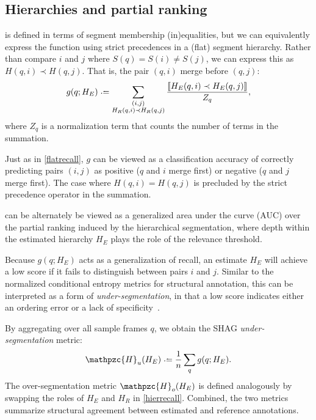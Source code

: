 \documentclass{article}
\def\shag{\ensuremath{\mathpzc{H}}}
\begin{document}
\subsection{Hierarchies and partial ranking}

 is defined in terms of segment membership (in)equalities, but 
we can equivalently express the function using strict precedences in a (flat)
segment hierarchy.
Rather than compare $i$ and $j$ where $S(q) = S(i) \neq S(j)$, we can express this as $H(q, i) \prec H(q, j)$.
That is, the pair $(q,i)$ merge before $(q,j)$:
\begin{equation}
g(q ; H_E) \defeq \sum_{\substack{(i, j)\\ H_R(q, i) \prec H_R(q, j)}}
\frac{\ind{H_E(q, i) \prec H_E(q, j)}}{Z_q},\label{hierrecall}
\end{equation}
where $Z_q$ is a normalization term that counts the number of terms in the summation.

Just as in \cref{flatrecall}, $g$ can be viewed as a classification accuracy of
correctly predicting pairs $(i, j)$ as positive ($q$ and $i$ merge first) or negative
($q$ and $j$ merge first).  The case where $H(q, i) = H(q, j)$ is precluded by the
strict precedence operator in the summation.

 can be alternately be viewed as a generalized area under the curve
(AUC) over the partial ranking induced by the hierarchical segmentation, where depth 
within the estimated hierarchy $H_E$ plays the role of the relevance threshold.

Because $g(q; H_E)$ acts as a generalization of recall, an estimate $H_E$ will achieve 
a low score if it fails to distinguish between pairs $i$ and $j$.  Similar to the 
normalized conditional entropy metrics for structural annotation, this can be interpreted 
as a form of \emph{under-segmentation}, in that a low score indicates either an ordering 
error or a lack of specificity~\cite{Lukashevich2008}.  

By aggregating over all sample frames $q$, we obtain the SHAG \emph{under-segmentation} metric:
\begin{equation}
\shag_u(H_E) \defeq \frac{1}{n} \sum_q g(q ; H_E).\label{shagunder}
\end{equation}
The over-segmentation metric $\shag_o(H_E)$ is defined analogously by swapping the roles of $H_E$ and $H_R$ in \cref{hierrecall}.
Combined, the two metrics summarize structural agreement between estimated and reference annotations.
\end{document}
